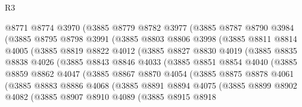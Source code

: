 \begin{lexlean}{R3}
\begin{coremodule}
            @8771
            @8774
            @3970
            (@3885
              @8779
              @8782
              @3977
              (@3885
                @8787
                @8790
                @3984
                (@3885
                  @8795
                  @8798
                  @3991
                  (@3885
                    @8803
                    @8806
                    @3998
                    (@3885
                      @8811
                      @8814
                      @4005
                      (@3885
                        @8819
                        @8822
                        @4012
                        (@3885
                          @8827
                          @8830
                          @4019
                          (@3885
                            @8835
                            @8838
                            @4026
                            (@3885
                              @8843
                              @8846
                              @4033
                              (@3885
                                @8851
                                @8854
                                @4040
                                (@3885
                                  @8859
                                  @8862
                                  @4047
                                  (@3885
                                    @8867
                                    @8870
                                    @4054
                                    (@3885
                                      @8875
                                      @8878
                                      @4061
                                      (@3885
                                        @8883
                                        @8886
                                        @4068
                                        (@3885
                                          @8891
                                          @8894
                                          @4075
                                          (@3885
                                            @8899
                                            @8902
                                            @4082
                                            (@3885
                                              @8907
                                              @8910
                                              @4089
                                              (@3885
                                                @8915
                                                @8918

\end{coremodule}
\end{lexlean}
